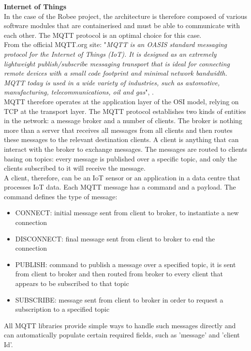 \textbf{Internet of Things}\\
In the case of the Robee project, the architecture is therefore composed of various software modules that are containerised and must be able to communicate with each other.
The MQTT protocol is an optimal choice for this case.\\
From the official MQTT.org site: "\textit{MQTT is an OASIS standard messaging protocol for
the Internet of Things (IoT). It is designed as an extremely lightweight publish/subscribe
messaging transport that is ideal for connecting remote devices with a small code footprint and minimal network bandwidth. MQTT today is used in a wide variety of industries, such as automotive, manufacturing, telecommunications, oil and gas}", \citet{mqtt}.\\
MQTT therefore operates at the application layer of the OSI model, relying on TCP at the transport layer.
The MQTT protocol establishes two kinds of entities in the network: a message broker and a number of clients. The broker is nothing more than a server that receives all messages from all clients and then routes these messages to the relevant destination clients. A client is anything that can interact with the broker to exchange messages. The messages are routed to clients basing
on topics: every message is published over a specific topic, and only the clients subscribed
to it will receive the message.\\ A client, therefore, can be an IoT sensor or an application in a data centre that processes IoT data.
Each MQTT message has a command and a payload. The command defines the type of message:
\begin{itemize}
    \item CONNECT: initial message sent from client to broker, to instantiate a new connection
    \item DISCONNECT: final message sent from client to broker to end the connection
    \item PUBLISH: command to publish a message over a specified topic, it is sent from client to broker and then routed from broker to every client that appears to be subscribed to that topic
    \item SUBSCRIBE: message sent from client to broker in order to request a subscription to a specified topic
\end{itemize}
All MQTT libraries provide simple ways to handle such messages directly and can automatically populate certain required fields, such as 'message' and 'client Id'.
